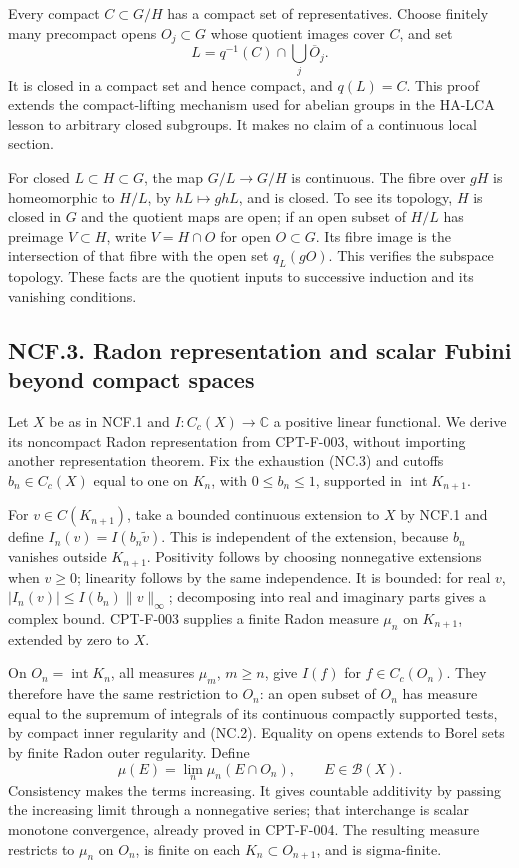 \documentclass[
  11pt,
]{article}
\begin{document}
Every compact \(C\subset G/H\) has a compact set of representatives.
Choose finitely many precompact opens \(O_j\subset G\) whose quotient
images cover \(C\), and set \[
 L=q^{-1}(C)\cap\bigcup_j\overline O_j.                 \tag{NC.4}
\] It is closed in a compact set and hence compact, and \(q(L)=C\). This
proof extends the compact-lifting mechanism used for abelian groups in
the HA-LCA lesson to arbitrary closed subgroups. It makes no claim of a
continuous local section.

For closed \(L\subset H\subset G\), the map \(G/L\to G/H\) is
continuous. The fibre over \(gH\) is homeomorphic to \(H/L\), by
\(hL\mapsto ghL\), and is closed. To see its topology, \(H\) is closed
in \(G\) and the quotient maps are open; if an open subset of \(H/L\)
has preimage \(V\subset H\), write \(V=H\cap O\) for open
\(O\subset G\). Its fibre image is the intersection of that fibre with
the open set \(q_L(gO)\). This verifies the subspace topology. These
facts are the quotient inputs to successive induction and its vanishing
conditions.

\subsection{NCF.3. Radon representation and scalar Fubini beyond compact
spaces}\label{ncf.3.-radon-representation-and-scalar-fubini-beyond-compact-spaces}

Let \(X\) be as in NCF.1 and \(I:C_c(X)\to\mathbb C\) a positive linear
functional. We derive its noncompact Radon representation from
CPT-F-003, without importing another representation theorem. Fix the
exhaustion (NC.3) and cutoffs \(b_n\in C_c(X)\) equal to one on \(K_n\),
with \(0\leq b_n\leq1\), supported in \(\operatorname{int}K_{n+1}\).

For \(v\in C(K_{n+1})\), take a bounded continuous extension to \(X\) by
NCF.1 and define \(I_n(v)=I(b_n\widetilde v)\). This is independent of
the extension, because \(b_n\) vanishes outside \(K_{n+1}\). Positivity
follows by choosing nonnegative extensions when \(v\geq0\); linearity
follows by the same independence. It is bounded: for real \(v\),
\(|I_n(v)|\leq I(b_n)\|v\|_\infty\); decomposing into real and imaginary
parts gives a complex bound. CPT-F-003 supplies a finite Radon measure
\(\mu_n\) on \(K_{n+1}\), extended by zero to \(X\).

On \(O_n=\operatorname{int}K_n\), all measures \(\mu_m\), \(m\geq n\),
give \(I(f)\) for \(f\in C_c(O_n)\). They therefore have the same
restriction to \(O_n\): an open subset of \(O_n\) has measure equal to
the supremum of integrals of its continuous compactly supported tests,
by compact inner regularity and (NC.2). Equality on opens extends to
Borel sets by finite Radon outer regularity. Define \[
 \mu(E)=\lim_n\mu_n(E\cap O_n),\qquad E\in\mathcal B(X).
                                                               \tag{NC.5}
\] Consistency makes the terms increasing. It gives countable additivity
by passing the increasing limit through a nonnegative series; that
interchange is scalar monotone convergence, already proved in CPT-F-004.
The resulting measure restricts to \(\mu_n\) on \(O_n\), is finite on
each \(K_n\subset O_{n+1}\), and is sigma-finite.
\end{document}
